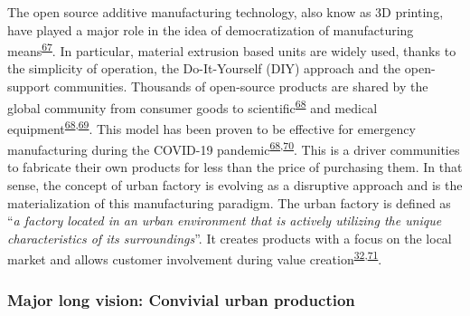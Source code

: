 \documentclass[
  12pt,
  a4paperpaper,
  onecolumn]{article}
\begin{document}
The open source additive manufacturing technology, also know as 3D
printing, have played a major role in the idea of democratization of
manufacturing
means\textsuperscript{\protect\hyperlink{ref-Beltagui2020}{67}}. In
particular, material extrusion based units are widely used, thanks to
the simplicity of operation, the Do-It-Yourself (DIY) approach and the
open-support communities. Thousands of open-source products are shared
by the global community from consumer goods to
scientific\textsuperscript{\protect\hyperlink{ref-Pearce2020a}{68}} and
medical
equipment\textsuperscript{\protect\hyperlink{ref-Pearce2020a}{68},\protect\hyperlink{ref-He2014}{69}}.
This model has been proven to be effective for emergency manufacturing
during the COVID-19
pandemic\textsuperscript{\protect\hyperlink{ref-Pearce2020a}{68},\protect\hyperlink{ref-tan2021}{70}}.
This is a driver communities to fabricate their own products for less
than the price of purchasing them. In that sense, the concept of urban
factory is evolving as a disruptive approach and is the materialization
of this manufacturing paradigm. The urban factory is defined as
``\emph{a factory located in an urban environment that is actively
utilizing the unique characteristics of its surroundings}''. It creates
products with a focus on the local market and allows customer
involvement during value
creation\textsuperscript{\protect\hyperlink{ref-Herrmann2020}{32},\protect\hyperlink{ref-Ijassi2022}{71}}.

\hypertarget{major-long-vision-convivial-urban-production}{%
\subsubsection{Major long vision: Convivial urban
production}\label{major-long-vision-convivial-urban-production}}
\end{document}
